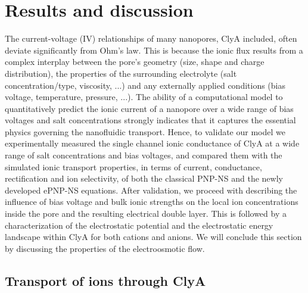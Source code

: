 \documentclass[journal=ancac3,manuscript=article,etalmode=truncate,maxauthors=0,layout=onecolumn]{achemso}
\begin{document}
\section{Results and discussion}\label{sec:results}

The current-voltage (IV) relationships of many nanopores, ClyA included, often
deviate significantly from Ohm's law. This is because the ionic flux results
from a complex interplay between the pore's geometry (size, shape and charge
distribution), the properties of the surrounding electrolyte (salt
concentration/type, viscosity, ...) and any externally applied conditions (bias
voltage, temperature, pressure, ...). The ability of a computational model to
quantitatively predict the ionic current of a nanopore over a wide range of bias
voltages and salt concentrations strongly indicates that it captures the
essential physics governing the nanofluidic transport. Hence, to validate our
model we experimentally measured the single channel ionic conductance of ClyA at
a wide range of salt concentrations and bias voltages, and compared them with
the simulated ionic transport properties, in terms of current, conductance,
rectification and ion selectivity, of both the classical PNP-NS and the newly
developed ePNP-NS equations. After validation, we proceed with describing the
influence of bias voltage and bulk ionic strengths on the local ion
concentrations inside the pore and the resulting electrical double layer. This
is followed by a characterization of the electrostatic potential and the
electrostatic energy landscape within ClyA for both cations and anions. We will
conclude this section by discussing the properties of the electroosmotic flow.

\subsection{Transport of ions through ClyA}\label{sec:iont}


\end{document}

